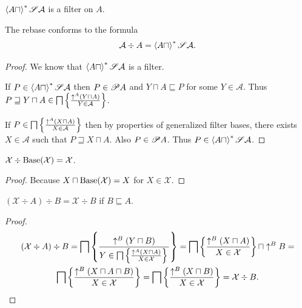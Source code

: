 \begin{obvious}
$\left\langle A\sqcap\right\rangle ^{\ast}\mathscr{S}\mathcal{A}$ is a filter on $A$.
\end{obvious}

\begin{prop}
The rebase conforms to the formula
\[
\mathcal{A}\div A=\left\langle A\sqcap\right\rangle ^{\ast}\mathscr{S}\mathcal{A}.
\]
\end{prop}

\begin{proof}
We know that $\left\langle A\sqcap\right\rangle ^{\ast}\mathscr{S}\mathcal{A}$ is a
filter.

If $P \in \left\langle A\sqcap\right\rangle ^{\ast}\mathscr{S}\mathcal{A}$ then $P \in \mathscr{P} A$ and $Y\sqcap A
\sqsubseteq P$ for some $Y \in \mathcal{A}$. Thus $P \sqsupseteq Y \sqcap A \in
\bigsqcap \left\{ \frac{ \uparrow^A  (Y \sqcap A) }{ Y \in \mathcal{A} }\right\}$.

If $P \in \bigsqcap \left\{ \frac{ \uparrow^A  (X \sqcap A) }{
X \in \mathcal{A} }\right\}$ then by properties of generalized filter bases,
there exists $X \in \mathcal{A}$ such that $P \sqsupseteq X \sqcap A$. Also $P \in
\mathscr{P} A$. Thus $P \in \left\langle A\sqcap\right\rangle ^{\ast}\mathscr{S}\mathcal{A}$.
\end{proof}

\begin{prop}\label{rebase-itself}
$\mathcal{X}\div\operatorname{Base}(\mathcal{X}) = \mathcal{X}$.
\end{prop}

\begin{proof}
Because $X\sqcap\operatorname{Base}(\mathcal{X}) = X$ for
$X\in\mathcal{X}$.
\end{proof}

\begin{prop}\label{double-rebase}
  $(\mathcal{X} \div A) \div B = \mathcal{X} \div B$ if $B \sqsubseteq A$.
\end{prop}

\begin{proof}
\begin{multline*}
(\mathcal{X} \div A) \div B = \bigsqcap \left\{ \frac{ \uparrow^B  (Y \sqcap B)
  }{ Y \in \bigsqcap \left\{ \frac{ \uparrow^A  (X \sqcap A)}{X \in \mathcal{X} }\right\} \mathcal{} }\right\} =
  \bigsqcap \left\{ \frac{ \uparrow^B  (X \sqcap A) }{ X \in
  \mathcal{X} }\right\} \sqcap \uparrow^B B =\\
  \bigsqcap \left\{ \frac{ \uparrow^B  (X
  \sqcap A \sqcap B) }{ X \in \mathcal{X} }\right\} =
  \bigsqcap \left\{ \frac{ \uparrow^B  (X
  \sqcap B) }{ X \in \mathcal{X} }\right\} =
  \mathcal{X} \div B.
\end{multline*}
\end{proof}

